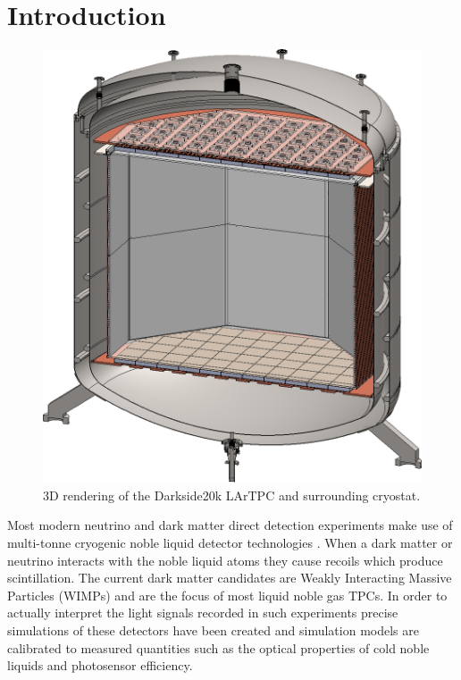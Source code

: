 \documentclass[11pt]{article} %
\begin{document}
\pagebreak

\section{Introduction}

\begin{figure}[H]
\centering
\includegraphics[scale=0.2]{images/LArTPC_diagram.png}
\caption{\cite{Aalseth_2018} 3D rendering of the Darkside20k LArTPC and surrounding cryostat.}
\label{fig:lartpc}
\end{figure}

Most modern neutrino and dark matter direct detection experiments make use of multi-tonne cryogenic noble liquid detector technologies \cite{rubbia1977liquid} \cite{Acciarri_2015} \cite{Chepel_2013}.
When a dark matter or neutrino interacts with the noble liquid atoms they cause recoils which produce scintillation. The current dark matter candidates are Weakly Interacting Massive Particles (WIMPs) \cite{pagani2017direct} and are the focus of most liquid noble gas TPCs. In order to actually interpret the light signals recorded in such experiments precise simulations of these detectors have been created \cite{Agnes_2017} and simulation models are calibrated to measured quantities such as the optical properties of cold noble liquids and photosensor efficiency.
\newline
\end{document}
